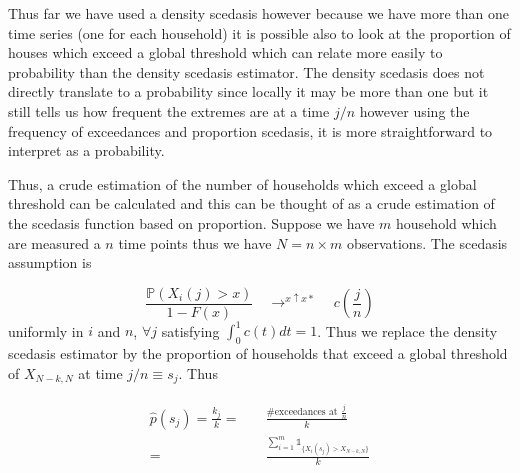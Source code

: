 \documentclass[a4paper]{article}
\begin{document}
%
%


Thus far we have used a density scedasis however because we have more than one time series (one for each household) it is possible also to look at the proportion of houses which exceed a global threshold which can relate more easily to probability than the density scedasis estimator. The density scedasis does not directly translate to a probability since locally it may be more than one but it still tells us how frequent the extremes are at a time $j/n$ however using the frequency of exceedances and proportion scedasis, it is more straightforward to interpret as a probability.

Thus, a crude estimation of the number of households which exceed a global threshold can be calculated and this can be thought of as a crude estimation of the scedasis function based on proportion. Suppose we have $m$ household which are measured a $n$ time points thus we have $N= n \times m$ observations. The scedasis assumption is

\begin{equation*}
\frac{\mathbb{P}(X_i(j)>x)}{1-F(x)} \quad  \displaystyle{ \mathop{\rightarrow}^{x \uparrow x*}} \quad c\left(\frac{j}{n}\right)
\end{equation*}
\noindent uniformly in $i$ and $n$, $\forall j$ satisfying $\int_0^1 c(t)dt = 1$. Thus we replace the density scedasis estimator by the proportion of households that exceed a global threshold of $X_{N-k,N}$ at time $j/n \equiv s_j$. Thus

\begin{align} \label{eq:sced_prop}
\begin{split}
\hat{p}(s_j) =  \frac{k_j}{k} =& \quad \frac{\# \text{exceedances at } \frac{j}{n}}{k} \\
= & \quad \frac{\sum_{i=1}^m \mathbb{1}_{\{X_i(s_j) > X_{N-k,N}\}}}{k}\\
\end{split}
\end{align}
\end{document}
